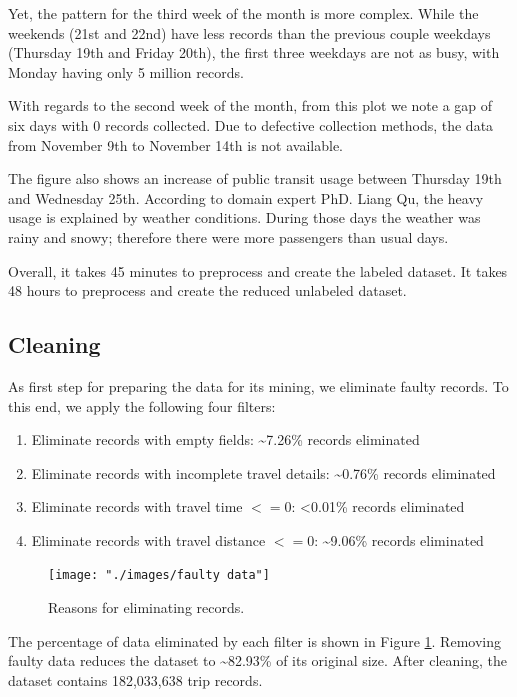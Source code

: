 \documentclass{article}
\begin{document}
Yet, the pattern for the third week of the month is more complex. While the weekends (21st and 22nd) have less records than the previous couple weekdays (Thursday 19th and Friday 20th), the first three weekdays are not as busy, with Monday having only 5 million records.

With regards to the second week of the month, from this plot we note a gap of six days with 0 records collected. Due to defective collection methods, the data from November 9th to November 14th is not available. 

The figure also shows an increase of public transit usage between Thursday 19th and Wednesday 25th. According to domain expert PhD. Liang Qu, the heavy usage is explained by weather conditions. During those days the weather was rainy and snowy; therefore there were more passengers than usual days.

Overall, it takes 45 minutes to preprocess and create the labeled dataset. It takes 48 hours to preprocess and create the reduced unlabeled dataset.

\subsection{Cleaning}
As first step for preparing the data for its mining, we eliminate faulty records. To this end, we apply the following four filters:

\begin{enumerate}
\item Eliminate records with empty fields: \textasciitilde 7.26\% records eliminated
\item Eliminate records with incomplete travel details: \textasciitilde 0.76\% records eliminated
\item Eliminate records with travel time $<= 0$: <0.01\% records eliminated
\item Eliminate records with travel distance $<= 0$: \textasciitilde 9.06\% records eliminated
\end{enumerate}

\begin{figure}[h]
  \centering
  \texttt{[image: "./images/faulty data"]} %
  \caption{Reasons for eliminating records.}
  \label{fig:preprocessing/faulty}
\end{figure}

The percentage of data eliminated by each filter is shown in Figure \ref{fig:preprocessing/faulty}. Removing faulty data reduces the dataset to \textasciitilde 82.93\% of its original size. After cleaning, the dataset contains 182,033,638 trip records.  %
\end{document}
